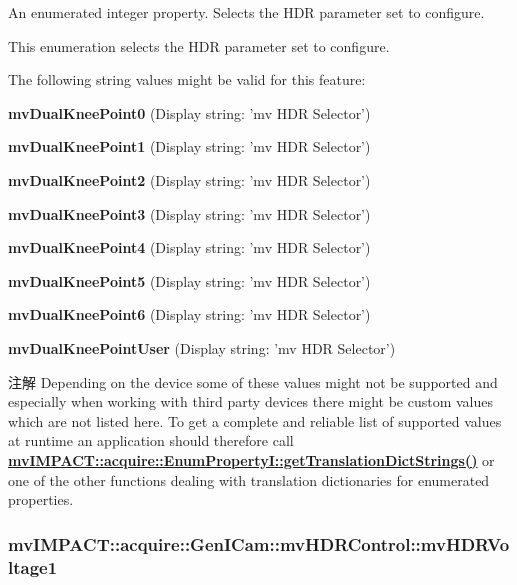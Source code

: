 An enumerated integer property. Selects the H\+D\+R parameter set to configure. 

This enumeration selects the H\+D\+R parameter set to configure.

The following string values might be valid for this feature\+:
\begin{DoxyItemize}
\item {\bfseries mv\+Dual\+Knee\+Point0} (Display string\+: 'mv H\+D\+R Selector')
\item {\bfseries mv\+Dual\+Knee\+Point1} (Display string\+: 'mv H\+D\+R Selector')
\item {\bfseries mv\+Dual\+Knee\+Point2} (Display string\+: 'mv H\+D\+R Selector')
\item {\bfseries mv\+Dual\+Knee\+Point3} (Display string\+: 'mv H\+D\+R Selector')
\item {\bfseries mv\+Dual\+Knee\+Point4} (Display string\+: 'mv H\+D\+R Selector')
\item {\bfseries mv\+Dual\+Knee\+Point5} (Display string\+: 'mv H\+D\+R Selector')
\item {\bfseries mv\+Dual\+Knee\+Point6} (Display string\+: 'mv H\+D\+R Selector')
\item {\bfseries mv\+Dual\+Knee\+Point\+User} (Display string\+: 'mv H\+D\+R Selector')
\end{DoxyItemize}

\begin{DoxyNote}{注解}
Depending on the device some of these values might not be supported and especially when working with third party devices there might be custom values which are not listed here. To get a complete and reliable list of supported values at runtime an application should therefore call {\bfseries \hyperlink{classmv_i_m_p_a_c_t_1_1acquire_1_1_enum_property_i_a0ba6ccbf5ee69784d5d0b537924d26b6}{mv\+I\+M\+P\+A\+C\+T\+::acquire\+::\+Enum\+Property\+I\+::get\+Translation\+Dict\+Strings()}} or one of the other functions dealing with translation dictionaries for enumerated properties. 
\end{DoxyNote}
\hypertarget{classmv_i_m_p_a_c_t_1_1acquire_1_1_gen_i_cam_1_1mv_h_d_r_control_a0e8c9c8edd8049a51b178fbf9b67abfe}{
\subsubsection[{mv\+H\+D\+R\+Voltage1}]{ mv\+I\+M\+P\+A\+C\+T\+::acquire\+::\+Gen\+I\+Cam\+::mv\+H\+D\+R\+Control\+::mv\+H\+D\+R\+Voltage1}}\label{classmv_i_m_p_a_c_t_1_1acquire_1_1_gen_i_cam_1_1mv_h_d_r_control_a0e8c9c8edd8049a51b178fbf9b67abfe}


